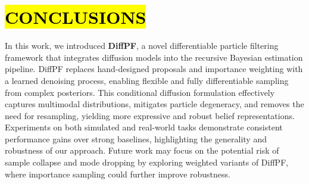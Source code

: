 \section{\texorpdfstring{\hl{CONCLUSIONS}}{CONCLUSIONS}}
In this work, we introduced \textbf{DiffPF}, a novel differentiable particle filtering framework that integrates diffusion models into the recursive Bayesian estimation pipeline. DiffPF replaces hand-designed proposals and importance weighting with a learned denoising process, enabling flexible and fully differentiable sampling from complex posteriors. This conditional diffusion formulation effectively captures multimodal distributions, mitigates particle degeneracy, and removes the need for resampling, yielding more expressive and robust belief representations. Experiments on both simulated and real-world tasks demonstrate consistent performance gains over strong baselines, highlighting the generality and robustness of our approach.
Future work may focus on the potential risk of sample collapse and mode dropping by exploring weighted variants of DiffPF, where importance sampling could further improve robustness. 





\vfill













